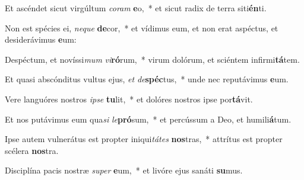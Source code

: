 \item Et ascéndet sicut virgúltum \textit{co}\textit{ram} \textbf{e}o,~* et sicut radix de terra siti\textbf{én}ti.
\item Non est spécies ei, \textit{ne}\textit{que} \textbf{de}cor,~* et vídimus eum, et non erat aspéctus, et desiderávimus \textbf{e}um:
\item Despéctum, et novíssi\textit{mum} \textit{vi}\textbf{ró}rum,~* virum dolórum, et sciéntem infirmi\textbf{tá}tem.
\item Et quasi abscónditus vultus ejus, \textit{et} \textit{de}\textbf{spéc}tus,~* unde nec reputávimus \textbf{e}um.
\item Vere languóres nostros \textit{ip}\textit{se} \textbf{tu}lit,~* et dolóres nostros ipse por\textbf{tá}vit.
\item Et nos putávimus eum qua\textit{si} \textit{le}\textbf{pró}sum,~* et percússum a Deo, et humili\textbf{á}tum.
\item Ipse autem vulnerátus est propter iniqui\textit{tá}\textit{tes} \textbf{nos}tras,~* attrítus est propter scélera \textbf{nos}tra.
\item Disciplína pacis nostræ \textit{su}\textit{per} \textbf{e}um,~* et livóre ejus sanáti \textbf{su}mus.
